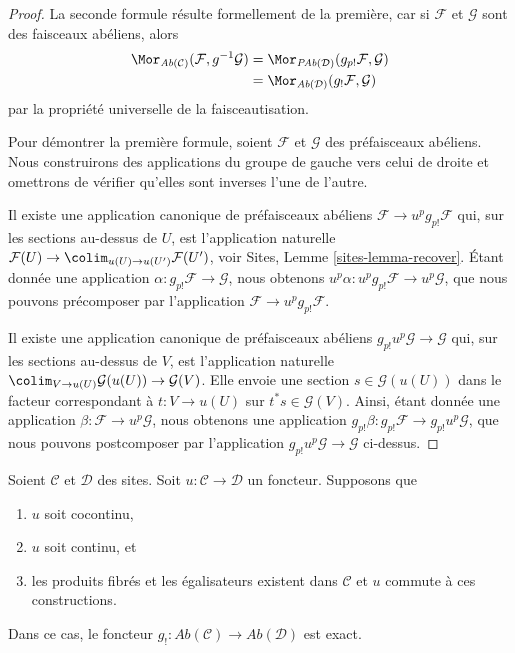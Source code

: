 \begin{proof}
La seconde formule résulte formellement de la première, car si $\mathcal{F}$ et
$\mathcal{G}$ sont des faisceaux abéliens, alors
\begin{align*}
\Mor_{\textit{Ab}(\mathcal{C})}(\mathcal{F}, g^{-1}\mathcal{G})
& =
\Mor_{\textit{PAb}(\mathcal{D})}(g_{p!}\mathcal{F}, \mathcal{G}) \\
& =
\Mor_{\textit{Ab}(\mathcal{D})}(g_!\mathcal{F}, \mathcal{G})
\end{align*}
par la propriété universelle de la faisceautisation.

\medskip\noindent
Pour démontrer la première formule, soient $\mathcal{F}$ et $\mathcal{G}$ des
préfaisceaux abéliens. Nous construirons des applications du groupe de gauche
vers celui de droite et omettrons de vérifier qu'elles sont inverses l'une de
l'autre.

\medskip\noindent
Il existe une application canonique de préfaisceaux abéliens
$\mathcal{F} \to u^pg_{p!}\mathcal{F}$ qui, sur les sections au-dessus de $U$,
est l'application naturelle
$\mathcal{F}(U) \to \colim_{u(U) \to u(U')} \mathcal{F}(U')$, voir Sites,
Lemme \ref{sites-lemma-recover}.
Étant donnée une application $\alpha : g_{p!}\mathcal{F} \to \mathcal{G}$,
nous obtenons $u^p\alpha : u^pg_{p!}\mathcal{F} \to u^p\mathcal{G}$, que nous
pouvons précomposer par l'application
$\mathcal{F} \to u^pg_{p!}\mathcal{F}$.

\medskip\noindent
Il existe une application canonique de préfaisceaux abéliens
$g_{p!}u^p\mathcal{G} \to \mathcal{G}$ qui, sur les sections au-dessus de $V$,
est l'application naturelle
$\colim_{V \to u(U)} \mathcal{G}(u(U)) \to \mathcal{G}(V)$.
Elle envoie une section $s \in \mathcal{G}(u(U))$ dans le facteur correspondant
à $t : V \to u(U)$ sur $t^*s \in \mathcal{G}(V)$. Ainsi, étant donnée une
application $\beta : \mathcal{F} \to u^p\mathcal{G}$, nous obtenons une
application $g_{p!}\beta : g_{p!}\mathcal{F} \to g_{p!}u^p\mathcal{G}$, que
nous pouvons postcomposer par l'application
$g_{p!}u^p\mathcal{G} \to \mathcal{G}$ ci-dessus.
\end{proof}

\begin{lemma}
\label{lemma-exactness-lower-shriek}
Soient $\mathcal{C}$ et $\mathcal{D}$ des sites. Soit
$u : \mathcal{C} \to \mathcal{D}$ un foncteur. Supposons que
\begin{enumerate}
\item[(a)] $u$ soit cocontinu,
\item[(b)] $u$ soit continu, et
\item[(c)] les produits fibrés et les égalisateurs existent dans
$\mathcal{C}$ et $u$ commute à ces constructions.
\end{enumerate}
Dans ce cas, le foncteur
$g_! : \textit{Ab}(\mathcal{C}) \to \textit{Ab}(\mathcal{D})$
est exact.
\end{lemma}

